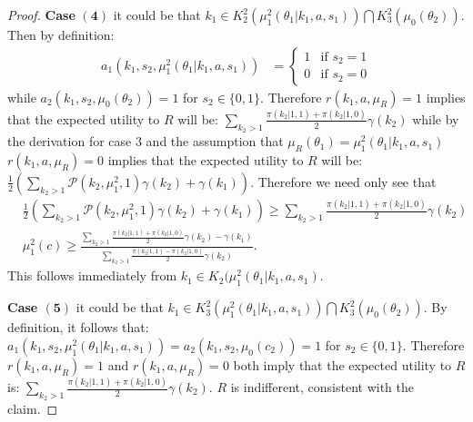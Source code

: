 \documentclass[11pt,]{article}
\begin{document}
\begin{proof}
\noindent\textbf{Case} $\mathbf{(4)}$ it could be that $k_1\in K^2_2(\mu_1^2(\theta_1|k_1,a,s_1))\bigcap K^2_3(\mu_0(\theta_2))$.  Then by definition:
\begin{align*}
a_1(k_1,s_2,\mu_1^2(\theta_1|k_1,a,s_1))&=\left\{\begin{array}{ll}
1&\mbox{if }s_2=1\\
0&\mbox{if }s_2=0
\end{array}\right.
\end{align*}while $a_2(k_1,s_2,\mu_0(\theta_2))=1$ for $s_2\in\{0,1\}$.  Therefore $r(k_1,a,\mu_R)=1$ implies that the expected utility to $R$ will be: $\sum_{k_2>1}\frac{\pi(k_2|1,1)+\pi(k_2|1,0)}{2}\gamma(k_2)$ while by the derivation for case $3$ and the assumption that $\mu_R(\theta_1)=\mu_1^2(\theta_1|k_1,a,s_1)$ $r(k_1,a,\mu_R)=0$ implies that the expected utility to $R$ will be: $\frac{1}{2}\left(\sum_{k_2>1}\mathcal{P}(k_2,\mu_1^2,1)\gamma(k_2)+\gamma(k_1)\right)$.  Therefore we need only see that
\begin{align*}
&\frac{1}{2}\left(\sum_{k_2>1}\mathcal{P}(k_2,\mu_1^2,1)\gamma(k_2)+\gamma(k_1)\right)\geq\sum_{k_2>1}\frac{\pi(k_2|1,1)+\pi(k_2|1,0)}{2}\gamma(k_2)\\
&\mu_1^2(c)\geq\frac{\sum_{k_2>1}\frac{\pi(k_2|1,1)+\pi(k_2|1,0)}{2}\gamma(k_2)-\gamma(k_1)}{\sum_{k_2>1}\frac{\pi(k_2|1,1)-\pi(k_2|1,0)}{2}\gamma(k_2)}.
\end{align*}This follows immediately from $k_1\in K_2(\mu_1^2(\theta_1|k_1,a,s_1)$.

\noindent\textbf{Case $\mathbf{(5)}$} it could be that $k_1\in K^2_3(\mu_1^2(\theta_1|k_1,a,s_1))\bigcap K^2_3(\mu_0(\theta_2))$.  By definition, it follows that: $a_1(k_1,s_2,\mu_1^2(\theta_1|k_1,a,s_1))=a_2(k_1,s_2,\mu_0(c_2))=1$ for $s_2\in\{0,1\}$.  Therefore $r(k_1,a,\mu_R)=1$ and $r(k_1,a,\mu_R)=0$ both imply that the expected utility to $R$ is: $\sum_{k_2>1}\frac{\pi(k_2|1,1)+\pi(k_2|1,0)}{2}\gamma(k_2)$.  $R$ is indifferent, consistent with the claim.
\end{proof}
\end{document}
